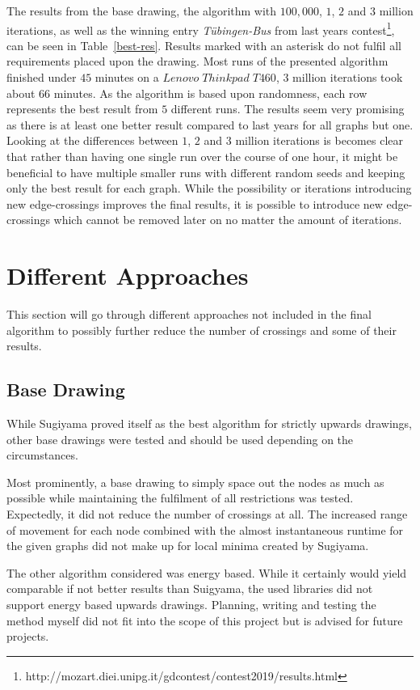 \documentclass[]{llncs}
\begin{document}
The results from the base drawing, the algorithm with $100,000$, $1$, $2$ and  $3$ million iterations, as well as the winning entry {\it Tübingen-Bus} from last years contest\footnote{http://mozart.diei.unipg.it/gdcontest/contest2019/results.html}, can be seen in Table~\ref{best-res}. Results marked with an asterisk do not fulfil all requirements placed upon the drawing. Most runs of the presented algorithm finished under $45$ minutes on a $Lenovo\;Thinkpad\;T460$, $3$ million iterations took about $66$ minutes. As the algorithm is based upon randomness, each row represents the best result from $5$ different runs. The results seem very promising as there is at least one better result compared to last years for all graphs but one. Looking at the differences between $1$, $2$ and $3$ million iterations is becomes clear that rather than having one single run over the course of one hour, it might be beneficial to have multiple smaller runs with different random seeds and keeping only the best result for each graph. While the possibility or iterations introducing new edge-crossings improves the final results, it is possible to introduce new edge-crossings which cannot be removed later on no matter the amount of iterations.

	\section{Different Approaches}
	This section will go through different approaches not included in the final algorithm to possibly further reduce the number of crossings and some of their results.

    \subsection{Base Drawing}
    While Sugiyama proved itself as the best algorithm for strictly upwards drawings, other base drawings were tested and should be used depending on the circumstances. 

    Most prominently, a base drawing to simply space out the nodes as much as possible while maintaining the fulfilment of all restrictions was tested. Expectedly, it did not reduce the number of crossings at all. The increased range of movement for each node combined with the almost instantaneous runtime for the given graphs did not make up for local minima created by Sugiyama.

    The other algorithm considered was energy based. While it certainly would yield comparable if not better results than Suigyama, the used libraries did not support energy based upwards drawings. Planning, writing and testing the method myself did not fit into the scope of this project but is advised for future projects.
\end{document}
